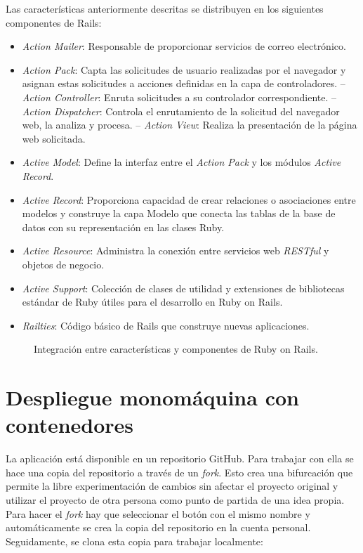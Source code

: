 Las características anteriormente descritas se distribuyen en los siguientes componentes de Rails:
\begin{itemize}
\item \textit{Action Mailer}: Responsable de proporcionar servicios de correo electrónico. 
\item \textit{Action Pack}: Capta las solicitudes de usuario realizadas por el navegador y asignan estas solicitudes a acciones definidas en la capa de controladores.
\subitem-- \textit{Action Controller}: Enruta solicitudes a su controlador correspondiente. 
\subitem-- \textit{Action Dispatcher}: Controla el enrutamiento de la solicitud del navegador web, la analiza y procesa.
\subitem-- \textit{Action View}: Realiza la presentación de la página web solicitada.
\item \textit{Active Model}: Define la interfaz entre el \textit{Action Pack} y los módulos \textit{Active Record}.
\item \textit{Active Record}: Proporciona capacidad de crear relaciones o asociaciones entre modelos y construye la capa Modelo que conecta las tablas de la base de datos con su representación en las clases Ruby.
\item \textit{Active Resource}: Administra la conexión entre servicios web \textit{RESTful} y objetos de negocio.
\item \textit{Active Support}: Colección de clases de utilidad y extensiones de bibliotecas estándar de Ruby útiles para el desarrollo en Ruby on Rails.
\item \textit{Railties}: Código básico de Rails que construye nuevas aplicaciones. \end{itemize}	 

\begin{figure}[H]
\caption{Integración entre características y componentes de Ruby on Rails.\label{fig:figure_placement_example}}
\end{figure}

\section{Despliegue monomáquina con contenedores}

La aplicación  está disponible en un repositorio GitHub. Para trabajar con ella se hace una copia del repositorio a través de un \textit{fork}. Esto crea una bifurcación que permite la libre experimentación de cambios sin afectar el proyecto original y utilizar el proyecto de otra persona como punto de partida de una idea propia. Para hacer el \textit{fork} hay que seleccionar el botón con el mismo nombre y automáticamente se crea la copia del repositorio en la cuenta personal. Seguidamente, se clona esta copia para trabajar localmente:

